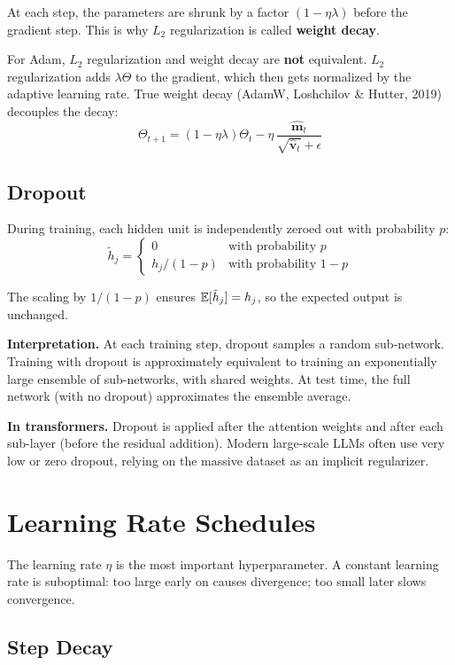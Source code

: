 \documentclass[main.tex]{subfiles}
\begin{document}
At each step, the parameters are shrunk by a factor $(1 - \eta\lambda)$ before the gradient step. This is why $L_2$ regularization is called \textbf{weight decay}.

\begin{remark}
For Adam, $L_2$ regularization and weight decay are \textbf{not} equivalent. $L_2$ regularization adds $\lambda\Theta$ to the gradient, which then gets normalized by the adaptive learning rate. True weight decay (AdamW, Loshchilov \& Hutter, 2019) decouples the decay:
$$\Theta_{t+1} = (1 - \eta\lambda)\Theta_t - \eta\,\frac{\hat{\mathbf{m}}_t}{\sqrt{\hat{\mathbf{v}}_t} + \epsilon}$$
\end{remark}

\subsection{Dropout}

During training, each hidden unit is independently zeroed out with probability $p$:
$$\tilde{h}_j = \begin{cases} 0 & \text{with probability } p \\[2pt] h_j / (1 - p) & \text{with probability } 1 - p \end{cases}$$

The scaling by $1/(1-p)$ ensures $\mathbb{E}[\tilde{h}_j] = h_j$, so the expected output is unchanged.

\textbf{Interpretation.} At each training step, dropout samples a random sub-network. Training with dropout is approximately equivalent to training an exponentially large ensemble of sub-networks, with shared weights. At test time, the full network (with no dropout) approximates the ensemble average.

\textbf{In transformers.} Dropout is applied after the attention weights and after each sub-layer (before the residual addition). Modern large-scale LLMs often use very low or zero dropout, relying on the massive dataset as an implicit regularizer.

\needspace{0.33\textheight}
\section{Learning Rate Schedules}

The learning rate $\eta$ is the most important hyperparameter. A constant learning rate is suboptimal: too large early on causes divergence; too small later slows convergence.

\subsection{Step Decay}
\end{document}
